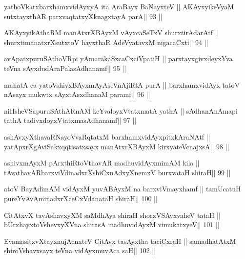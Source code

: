 \begin{shl}
yathoVkatxbarxhamxvidAyxyA ita AraBayx BaNayxteV ||
AKAyxyikeVyaM sutxtayxthAR parxvaqtatxyXknagxtayA parA\hfill || 93 ||
\end{shl}

\begin{shl}
AKAyxyikAthaRM manAtxrXBAyxM vAyxcaSeTxV shurxtirAdarAtf ||
shurxtimanatxrXsutxtoV hayxthaR AdeVyatavxM nigacaCxti\hfill || 94 ||
\end{shl}

\begin{shl}
avApatxpuruSAthoVR\s pi yAmarakaSxcaCxciVpatiH ||
parxtayxgivxdeyxYva teVna sAyxdudAraPalasAdhanamf\hfill || 95 ||
\end{shl}

\begin{shl}
mahatA ca yatoV\s shivxBAyxmAyAseVnAjiRtA purA ||
barxhamxvidAyx tatoV nAsayx mukwtx sAyxtAsxdhanaM paramf\hfill || 96 ||
\end{shl}

\begin{shl}
niHsheVSapuruSAthARnAM keYvaloyxVtatxmatA yathA ||
sAdhanAnAmapi tathA tadivxdoyxVtatxmasAdhanamf\hfill || 97 ||
\end{shl}

\begin{shl}
ashAvxyXthavaRNayoVvaRqtatxM barxhamxvidAyxpitxkAraNAtf ||
yatApxrXgAviSakxqqtisatxsayx manAtxrXBAyxM kirxyateV\s cnajxsA\hfill || 98 ||
\end{shl}

\begin{shl}
ashivxmAyxM pArxthiRtoV\s thavAR madhuvidAyxmimAM kila ||
tAvathavAR\s barxviVdinadxrXshiCxnAdxyXnemxV burxvataH shiraH\hfill || 99 ||
\end{shl}

\begin{shl}
atoV BayAdimAM vidAyxM yuvABAyxM na barxviVmayxhamf ||
tamUcatuH pureYvA\s\s vAminadxrXceCxVdanataH shiraH\hfill || 100 ||
\end{shl}

\begin{shl}
CitAtxvX tavAshavxyXM saMdhAya shiraH shorxVSAyxvaheV tataH ||
bUrxhayxtoV\s shevxyXVna shirasA madhuvidAyxM vimukatxyeV\hfill || 101 ||
\end{shl}

\begin{shl}
EvamasitxvXtayxnujAcnxteV CitAvx tasAyxtha taciCxraH ||
samadhatAtxM shiroV\s shavxsayx teVna vidAyxmuvAca saH\hfill || 102 ||
\end{shl}

